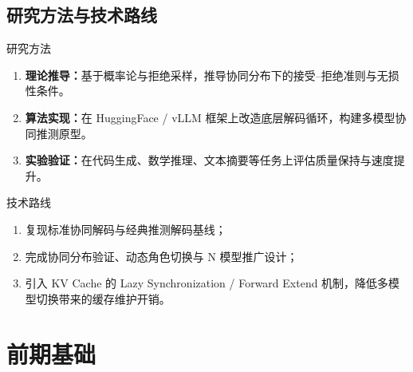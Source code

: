 \documentclass[8pt]{ctexbeamer}
\begin{document}
\subsection{研究方法与技术路线}
\begin{frame}{\insertsection}{\insertsubsection}
    \begin{block}{研究方法}
        \begin{enumerate}
            \item \textbf{理论推导：}基于概率论与拒绝采样，推导协同分布下的接受--拒绝准则与无损性条件。
            \item \textbf{算法实现：}在 HuggingFace / vLLM 框架上改造底层解码循环，构建多模型协同推测原型。
            \item \textbf{实验验证：}在代码生成、数学推理、文本摘要等任务上评估质量保持与速度提升。
        \end{enumerate}
    \end{block}

    \begin{block}{技术路线}
        \begin{enumerate}
            \item 复现标准协同解码与经典推测解码基线；
            \item 完成协同分布验证、动态角色切换与 N 模型推广设计；
            \item 引入 KV Cache 的 Lazy Synchronization / Forward Extend 机制，降低多模型切换带来的缓存维护开销。
        \end{enumerate}
    \end{block}
\end{frame}

\section{前期基础}
\end{document}
